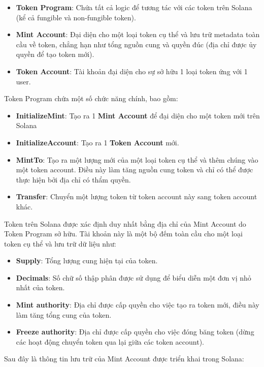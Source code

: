 \begin{itemize}
    \item \textbf{Token Program}: Chứa tất cả logic để tương tác với các token
          trên Solana (kể cả fungible và non-fungible token).

    \item \textbf{Mint Account}: Đại diện cho một loại token cụ thể và lưu trữ
          metadata toàn cầu về token, chẳng hạn như tổng nguồn cung và quyền
          đúc (địa chỉ
          được ủy quyền để tạo token mới).

    \item \textbf{Token Account}: Tài khoản đại diện cho sự sở hữu 1 loại token
          ứng với 1 user.
\end{itemize}
Token Program chứa một số chức năng chính, bao gồm:
\begin{itemize}
    \item \textbf{InitializeMint}: Tạo ra 1 \textbf{Mint Account} để đại diện
          cho một token mới trên Solana

    \item \textbf{InitializeAccount}: Tạo ra 1 \textbf{Token Account} mới.

    \item \textbf{MintTo}: Tạo ra một lượng mới của một loại token cụ thể và
          thêm chúng vào một token account. Điều này làm tăng nguồn cung token
          và chỉ có
          thể được thực hiện bởi địa chỉ có thẩm quyền.

    \item \textbf{Transfer}: Chuyển một lượng token từ token account này sang
          token account khác.

\end{itemize}
Token trên Solana được xác định duy nhất bằng địa chỉ của Mint Account do Token
Program sở hữu. Tài khoản này là một bộ đếm toàn cầu cho một loại token cụ thể
và lưu trữ dữ liệu như:

\begin{itemize}
    \item \textbf{Supply}: Tổng lượng cung hiện tại của token.

    \item \textbf{Decimals}: Số chữ số thập phân được sử dụng để biểu diễn một
          đơn vị nhỏ nhất của token.

    \item \textbf{Mint authority}: Địa chỉ được cấp quyền cho việc tạo ra token
          mới, điều này làm tăng tổng cung của token.

    \item \textbf{Freeze authority}: Địa chỉ được cấp quyền cho việc đóng băng
          token (dừng các hoạt động chuyển token qua lại giữa các token
          account).

\end{itemize}
Sau đây là thông tin lưu trữ của Mint Account được triển khai trong Solana:

